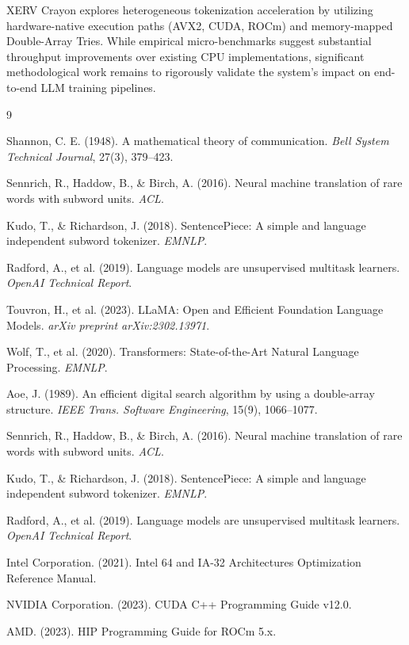 \documentclass[11pt,a4paper,twocolumn]{article}
\begin{document}
XERV Crayon explores heterogeneous tokenization acceleration by utilizing hardware-native execution paths (AVX2, CUDA, ROCm) and memory-mapped Double-Array Tries. While empirical micro-benchmarks suggest substantial throughput improvements over existing CPU implementations, significant methodological work remains to rigorously validate the system's impact on end-to-end LLM training pipelines.

\begin{thebibliography}{9}

Shannon, C. E. (1948). A mathematical theory of communication. \textit{Bell System Technical Journal}, 27(3), 379--423.

Sennrich, R., Haddow, B., \& Birch, A. (2016). Neural machine translation of rare words with subword units. \textit{ACL}.

Kudo, T., \& Richardson, J. (2018). SentencePiece: A simple and language independent subword tokenizer. \textit{EMNLP}.

Radford, A., et al. (2019). Language models are unsupervised multitask learners. \textit{OpenAI Technical Report}.

Touvron, H., et al. (2023). LLaMA: Open and Efficient Foundation Language Models. \textit{arXiv preprint arXiv:2302.13971}.

Wolf, T., et al. (2020). Transformers: State-of-the-Art Natural Language Processing. \textit{EMNLP}.

Aoe, J. (1989). An efficient digital search algorithm by using a double-array structure. \textit{IEEE Trans. Software Engineering}, 15(9), 1066--1077.

Sennrich, R., Haddow, B., \& Birch, A. (2016). Neural machine translation of rare words with subword units. \textit{ACL}.

Kudo, T., \& Richardson, J. (2018). SentencePiece: A simple and language independent subword tokenizer. \textit{EMNLP}.

Radford, A., et al. (2019). Language models are unsupervised multitask learners. \textit{OpenAI Technical Report}.

Intel Corporation. (2021). Intel 64 and IA-32 Architectures Optimization Reference Manual.

NVIDIA Corporation. (2023). CUDA C++ Programming Guide v12.0.

AMD. (2023). HIP Programming Guide for ROCm 5.x.

\end{thebibliography}
\end{document}
